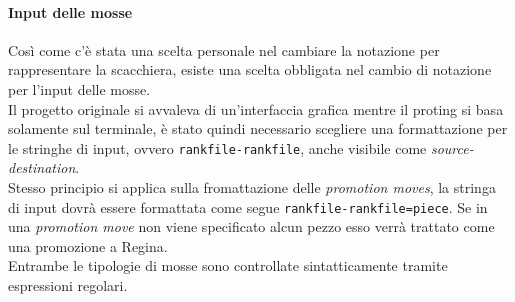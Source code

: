 \documentclass{article}
\begin{document}
        \paragraph{Input delle mosse}
            Così come c'è stata una scelta personale nel cambiare la notazione per rappresentare la scacchiera, esiste una scelta obbligata nel cambio di notazione per l'input delle mosse.\\
            Il progetto originale si avvaleva di un'interfaccia grafica mentre il proting si basa solamente sul terminale, è stato quindi necessario scegliere una formattazione per le stringhe di input, ovvero \texttt{rankfile-rankfile}, anche visibile come \textit{source-destination}.\\
            Stesso principio si applica sulla fromattazione delle \textit{promotion moves}, la stringa di input dovrà essere formattata come segue \texttt{rankfile-rankfile=piece}. Se in una \textit{promotion move} non viene specificato alcun pezzo esso verrà trattato come una promozione a Regina.\\
            Entrambe le tipologie di mosse sono controllate sintatticamente tramite espressioni regolari.
\end{document}
